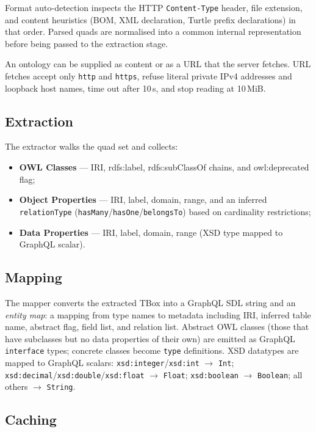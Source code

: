 \documentclass[sigconf,nonacm]{acmart}
\begin{document}
Format auto-detection inspects the HTTP \texttt{Content-Type} header,
file extension, and content heuristics (BOM, XML declaration,
Turtle prefix declarations) in that order.  Parsed quads are
normalised into a common internal representation before being passed
to the extraction stage.

An ontology can be supplied as content or as a URL that the server
fetches.  URL fetches accept only \texttt{http} and \texttt{https},
refuse literal private IPv4 addresses and loopback host names, time out
after 10\,s, and stop reading at 10\,MiB.

\subsection{Extraction}

The extractor walks the quad set and collects:
\begin{itemize}
  \item \textbf{OWL Classes} --- IRI, rdfs:label, rdfs:subClassOf chains,
        and owl:deprecated flag;
  \item \textbf{Object Properties} --- IRI, label, domain, range, and
        an inferred \texttt{relationType}
        (\texttt{hasMany}/\texttt{hasOne}/\texttt{belongsTo}) based on
        cardinality restrictions;
  \item \textbf{Data Properties} --- IRI, label, domain, range (XSD type
        mapped to GraphQL scalar).
\end{itemize}

\subsection{Mapping}

The mapper converts the extracted TBox into a GraphQL SDL string and
an \emph{entity map}: a mapping from type names to metadata including
IRI, inferred table name, abstract flag, field list, and relation list.
Abstract OWL classes (those that have subclasses but no data properties
of their own) are emitted as GraphQL \texttt{interface} types;
concrete classes become \texttt{type} definitions.  XSD datatypes are
mapped to GraphQL scalars: \texttt{xsd:integer}/\texttt{xsd:int}
$\to$ \texttt{Int}; \texttt{xsd:decimal}/\texttt{xsd:double}/\texttt{xsd:float}
$\to$ \texttt{Float}; \texttt{xsd:boolean} $\to$ \texttt{Boolean};
all others $\to$ \texttt{String}.

\subsection{Caching}
\end{document}
